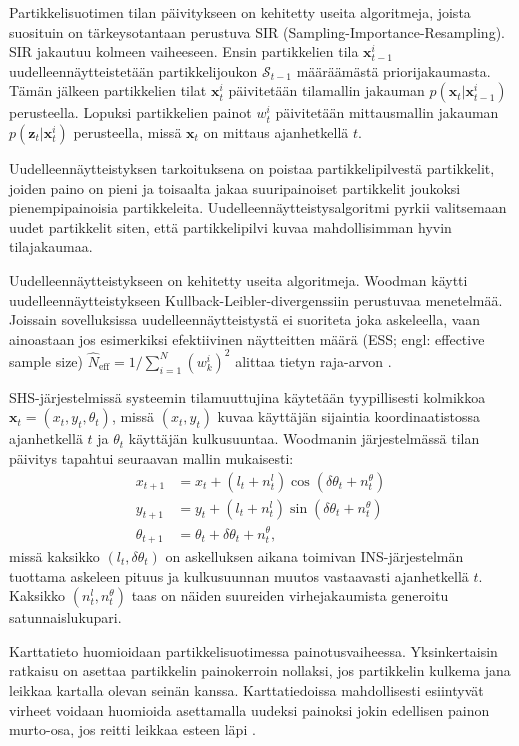 Partikkelisuotimen tilan päivitykseen on kehitetty useita algoritmeja,
joista suosituin on tärkeysotantaan perustuva SIR
(Sampling\hyp{}Importance\hyp{}Resampling). SIR jakautuu kolmeen vaiheeseen.
Ensin partikkelien tila $\mathbf{x}_{t-1}^i$ uudelleennäytteistetään
partikkelijoukon $\mathcal{S}_{t-1}$
määräämästä priorijakaumasta. Tämän jälkeen partikkelien tilat
$\mathbf{x}_t^i$ päivitetään tilamallin jakauman
$p(\mathbf{x}_t | \mathbf{x}_{t-1}^i)$ perusteella. Lopuksi 
partikkelien painot $w_t^i$ päivitetään mittausmallin jakauman
$p(\mathbf{z}_t | \mathbf{x}_t^i)$ perusteella, missä
$\mathbf{x}_t$ on mittaus ajanhetkellä $t$.

Uudelleennäytteistyksen tarkoituksena on poistaa partikkelipilvestä
partikkelit, joiden paino on pieni ja toisaalta jakaa suuripainoiset
partikkelit joukoksi pienempipainoisia partikkeleita.
Uudelleennäytteistysalgoritmi pyrkii valitsemaan uudet partikkelit siten,
että partikkelipilvi kuvaa mahdollisimman hyvin tilajakaumaa.

Uudelleennäytteistykseen on kehitetty useita algoritmeja.
Woodman \cite{woodman2008} käytti uudelleennäytteistykseen
Kullback-Leibler-divergenssiin perustuvaa menetelmää. Joissain sovelluksissa
uudelleennäytteistystä ei suoriteta joka askeleella, vaan ainoastaan jos
esimerkiksi efektiivinen näytteitten määrä (ESS; engl: effective sample size)
$\hat{N}_{\text{eff}} = 1 / \sum_{i=1}^N (w_k^i)^2$ alittaa tietyn
raja-arvon \cite{fadjukoff2013}.

SHS-järjestelmissä systeemin tilamuuttujina käytetään tyypillisesti
kolmikkoa $\mathbf{x}_t = (x_t, y_t, \theta_t)$, missä $(x_t, y_t)$ kuvaa
käyttäjän sijaintia koordinaatistossa ajanhetkellä $t$ ja $\theta_t$
käyttäjän kulkusuuntaa. 
Woodmanin \cite{woodman2008} järjestelmässä tilan päivitys tapahtui
seuraavan mallin mukaisesti:
\begin{align}
  x_{t+1}       &= x_t + (l_t + n_t^l) \cos(\delta\theta_t + n_t^\theta) \\
  y_{t+1}       &= y_t + (l_t + n_t^l) \sin(\delta\theta_t + n_t^\theta) \\
  \theta_{t+1}  &= \theta_t + \delta\theta_t + n_t^\theta,
\end{align}
missä kaksikko $(l_t, \delta\theta_t)$ on askelluksen aikana toimivan
INS-järjestelmän tuottama askeleen pituus ja kulkusuunnan muutos vastaavasti
ajanhetkellä $t$. Kaksikko $(n_t^l, n_t^\theta)$ taas on näiden suureiden
virhejakaumista generoitu satunnaislukupari.

Karttatieto huomioidaan partikkelisuotimessa painotusvaiheessa. Yksinkertaisin
ratkaisu on asettaa partikkelin painokerroin nollaksi, jos partikkelin
kulkema jana leikkaa kartalla olevan seinän kanssa. Karttatiedoissa
mahdollisesti esiintyvät virheet voidaan huomioida asettamalla
uudeksi painoksi jokin edellisen painon murto-osa, jos reitti leikkaa
esteen läpi \cite{fadjukoff2013}.

